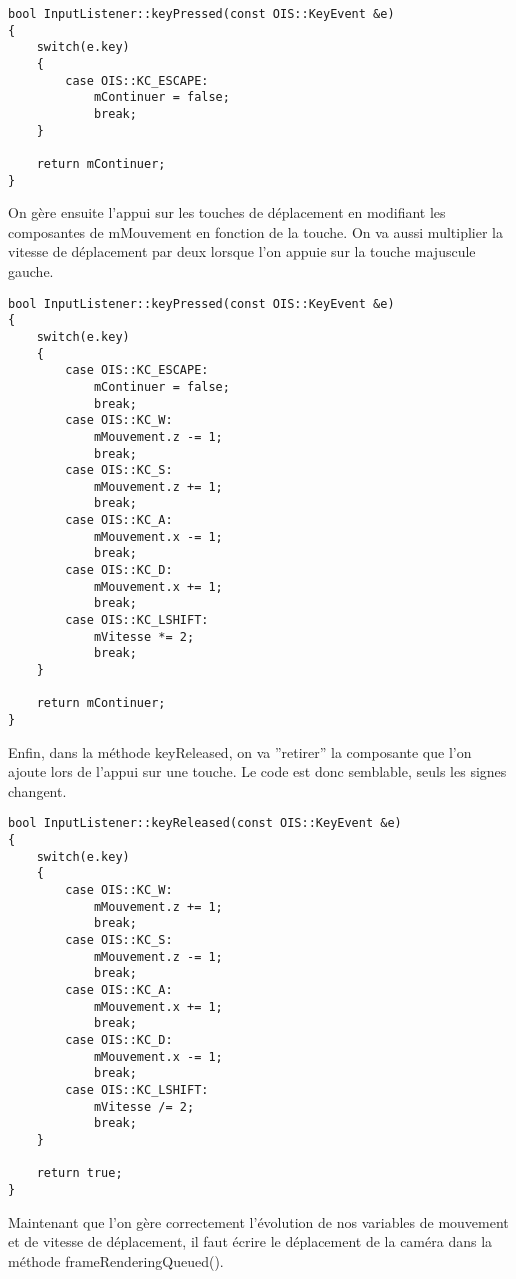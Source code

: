 \begin{lstlisting}[caption={Impl\'ementation de l'appuie sur ECHAP}]
bool InputListener::keyPressed(const OIS::KeyEvent &e)
{
    switch(e.key)
    {
        case OIS::KC_ESCAPE:
            mContinuer = false;
            break;
    }

    return mContinuer;
}
\end{lstlisting}

On g\`ere ensuite l'appui sur les touches de d\'eplacement en modifiant les composantes de mMouvement en fonction de la touche. On va aussi multiplier la vitesse de d\'eplacement par deux lorsque l'on appuie sur la touche majuscule gauche.

\begin{lstlisting}[caption={Impl\'ementation de l'appuie sur les touches de d\'eplacement}]
bool InputListener::keyPressed(const OIS::KeyEvent &e)
{
    switch(e.key)
    {
        case OIS::KC_ESCAPE:
            mContinuer = false;
            break;
        case OIS::KC_W:
            mMouvement.z -= 1;
            break;
        case OIS::KC_S:
            mMouvement.z += 1;
            break;
        case OIS::KC_A:
            mMouvement.x -= 1;
            break;
        case OIS::KC_D:
            mMouvement.x += 1;
            break;
        case OIS::KC_LSHIFT:
            mVitesse *= 2;
            break;
    }

    return mContinuer;
}
\end{lstlisting}

Enfin, dans la m\'ethode keyReleased, on va ''retirer'' la composante que l'on ajoute lors de l'appui sur une touche. Le code est donc semblable, seuls les signes changent.

\begin{lstlisting}[caption={}]
bool InputListener::keyReleased(const OIS::KeyEvent &e)
{
    switch(e.key)
    {
        case OIS::KC_W:
            mMouvement.z += 1;
            break;
        case OIS::KC_S:
            mMouvement.z -= 1;
            break;
        case OIS::KC_A:
            mMouvement.x += 1;
            break;
        case OIS::KC_D:
            mMouvement.x -= 1;
            break;
        case OIS::KC_LSHIFT:
            mVitesse /= 2;
            break;
    }

    return true;
}
\end{lstlisting}

Maintenant que l'on g\`ere correctement l'\'evolution de nos variables de mouvement et de vitesse de d\'eplacement, il faut \'ecrire le d\'eplacement de la cam\'era dans la m\'ethode frameRenderingQueued().

